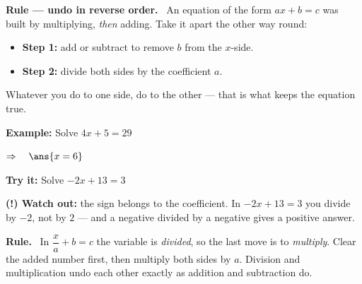 \documentclass[12pt]{article}
\begin{document}


\begin{formulabox}
\textbf{Rule --- undo in reverse order.} \ An equation of the form $ax + b = c$ was built by multiplying, \emph{then} adding. Take it apart the other way round:
\begin{itemize}[leftmargin=0.8cm, itemsep=0pt, topsep=2pt]
  \item \textbf{Step 1:} add or subtract to remove $b$ from the $x$-side.
  \item \textbf{Step 2:} divide both sides by the coefficient $a$.
\end{itemize}
Whatever you do to one side, do to the other --- that is what keeps the equation true.
\end{formulabox}

\begin{examplebox}
\textbf{Example:} \quad Solve $4x + 5 = 29$


$\Rightarrow\quad \ans{x = 6}$
\end{examplebox}

\begin{tryitbox}
\textbf{Try it:} \quad Solve $-2x + 13 = 3$\\[2pt]
\end{tryitbox}

\begin{watchoutbox}
\textbf{(!) Watch out:} the sign belongs to the coefficient. In $-2x + 13 = 3$ you divide by $-2$, not by $2$ --- and a negative divided by a negative gives a positive answer.
\end{watchoutbox}


\begin{formulabox}
\textbf{Rule.} \ In $\dfrac{x}{a} + b = c$ the variable is \emph{divided}, so the last move is to \emph{multiply}. Clear the added number first, then multiply both sides by $a$. Division and multiplication undo each other exactly as addition and subtraction do.
\end{formulabox}
\end{document}

